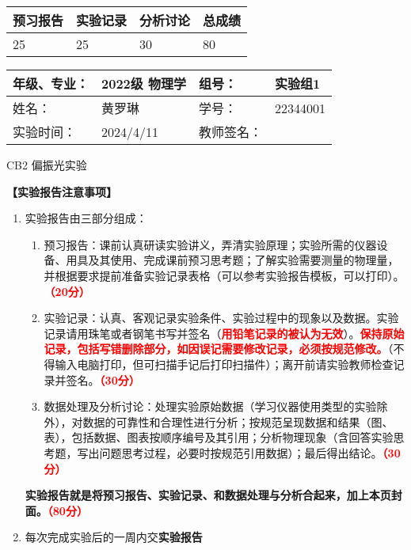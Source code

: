 \documentclass[dvipsnames, svgnames,a4paper,11pt]{article}
\begin{document}
	
	\begin{table}
		\renewcommand\arraystretch{1.7}
		\begin{tabularx}{\textwidth}{
				|X|X|X|X
				|X|X|X|X|}
			\hline
			\multicolumn{2}{|c|}{预习报告}&\multicolumn{2}{|c|}{实验记录}&\multicolumn{2}{|c|}{分析讨论}&\multicolumn{2}{|c|}{总成绩}\\
			\hline
			\LARGE25 & & \LARGE25 & & \LARGE30 & & \LARGE80 & \\
			\hline
		\end{tabularx}
	\end{table}
	
	\begin{table}
		\renewcommand\arraystretch{1.7}
		\begin{tabularx}{\textwidth}{|X|X|X|X|}
			\hline
			年级、专业： & 2022级 物理学 &组号： & 实验组1\\
			\hline
			姓名： & 黄罗琳   & 学号： &22344001   \\
			\hline
			实验时间： & 2024/4/11 & 教师签名： & \\
			\hline
		\end{tabularx}
	\end{table}
	
	\begin{center}
		\LARGE CB2  \quad 偏振光实验
	\end{center}
	
	
	\textbf{【实验报告注意事项】}
	\begin{enumerate}
		\item 实验报告由三部分组成：
		\begin{enumerate}
			\item 预习报告：课前认真研读实验讲义，弄清实验原理；实验所需的仪器设备、用具及其使用、完成课前预习思考题；了解实验需要测量的物理量，并根据要求提前准备实验记录表格（可以参考实验报告模板，可以打印）。\textcolor{red}{\textbf{（20分）}}
			\item 实验记录：认真、客观记录实验条件、实验过程中的现象以及数据。实验记录请用珠笔或者钢笔书写并签名（\textcolor{red}{\textbf{用铅笔记录的被认为无效}}）。\textcolor{red}{\textbf{保持原始记录，包括写错删除部分，如因误记需要修改记录，必须按规范修改。}}（不得输入电脑打印，但可扫描手记后打印扫描件）；离开前请实验教师检查记录并签名。\textcolor{red}{\textbf{（30分）}}
			\item 数据处理及分析讨论：处理实验原始数据（学习仪器使用类型的实验除外），对数据的可靠性和合理性进行分析；按规范呈现数据和结果（图、表），包括数据、图表按顺序编号及其引用；分析物理现象（含回答实验思考题，写出问题思考过程，必要时按规范引用数据）；最后得出结论。\textcolor{red}{\textbf{（30分）}}
		\end{enumerate}
		\textbf{实验报告就是将预习报告、实验记录、和数据处理与分析合起来，加上本页封面。\textcolor{red}{（80分）}}
		\item 每次完成实验后的一周内交\textbf{实验报告}
		
	\end{enumerate}
	
\end{document}
